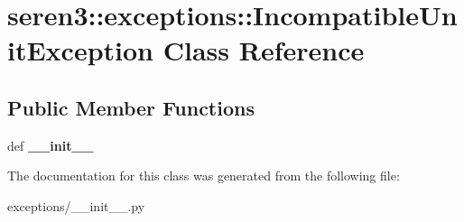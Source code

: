 \hypertarget{classseren3_1_1exceptions_1_1IncompatibleUnitException}{
\section{seren3::exceptions::IncompatibleUnitException Class Reference}
\label{classseren3_1_1exceptions_1_1IncompatibleUnitException}
}
\subsection*{Public Member Functions}
\begin{DoxyCompactItemize}
\item 
\hypertarget{classseren3_1_1exceptions_1_1IncompatibleUnitException_a60b9a4a960ca94a1a27c2d1ebd16feec}{
def {\bfseries \_\-\_\-init\_\-\_\-}}
\label{classseren3_1_1exceptions_1_1IncompatibleUnitException_a60b9a4a960ca94a1a27c2d1ebd16feec}

\end{DoxyCompactItemize}


The documentation for this class was generated from the following file:\begin{DoxyCompactItemize}
\item 
exceptions/\_\-\_\-init\_\-\_\-.py\end{DoxyCompactItemize}
